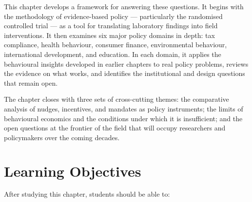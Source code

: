 \documentclass[12pt, letterpaper]{article}
\begin{document}
This chapter develops a framework for answering these questions. It begins with the methodology of evidence-based policy --- particularly the randomised controlled trial --- as a tool for translating laboratory findings into field interventions. It then examines six major policy domains in depth: tax compliance, health behaviour, consumer finance, environmental behaviour, international development, and education. In each domain, it applies the behavioural insights developed in earlier chapters to real policy problems, reviews the evidence on what works, and identifies the institutional and design questions that remain open.

The chapter closes with three sets of cross-cutting themes: the comparative analysis of nudges, incentives, and mandates as policy instruments; the limits of behavioural economics and the conditions under which it is insufficient; and the open questions at the frontier of the field that will occupy researchers and policymakers over the coming decades.

\medskip


\section*{Learning Objectives}


After studying this chapter, students should be able to:
\end{document}
